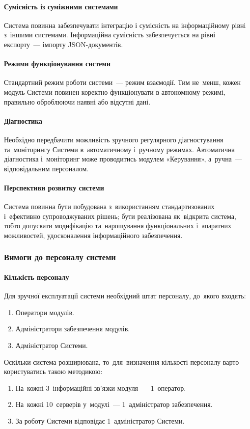 \documentclass[
	a4paper,
	oneside,
	BCOR = 10mm,
	DIV = 12,
	12pt,
	headings = normal,
]{scrartcl}
\newcommand{\allcaps}[1]{{\addfontfeatures{LetterSpace = 8, Kerning = Off}#1}}
\begin{document}
				\paragraph{Сумісність із суміжними системами}
					Система повинна забезпечувати інтеграцію і сумісність на інформаційному рівні з~іншими системами. Інформаційна сумісність забезпечується на рівні експорту~— імпорту \allcaps{JSON}-документів.

				\paragraph{Режими функціонування системи}
					Стандартний режим роботи системи~— режим взаємодії. Тим не~менш, кожен модуль Системи повинен коректно функціонувати в автономному режимі, правильно оброблюючи наявні або відсутні дані.

				\paragraph{Діагностика}
					Необхідно передбачити можливість зручного регулярного діагностування та~моніторингу Системи в~автоматичному і~ручному режимах. Автоматична діагностика і~моніторинг може проводитись модулем «Керування», а~ручна~— відповідальним персоналом.

				\paragraph{Перспективи розвитку системи}
					Система повинна бути побудована з~використанням стандартизованих і~ефективно супроводжуваних рішень; бути реалізована як~відкрита система, тобто допускати модифікацію та~нарощування функціональних і~апаратних можливостей, удосконалення інформаційного забезпечення.

			\subsubsection{Вимоги до персоналу системи}
				\paragraph{Кількість персоналу}
					Для зручної експлуатації системи необхідний штат персоналу, до~якого входять:
					\begin{enumerate}[noitemsep]
						\item Оператори модулів.
						\item Адміністратори забезпечення модулів.
						\item Адміністратор Системи.
					\end{enumerate}
					Оскільки система розширювана, то~для~визначення кількості персоналу варто користуватись такою методикою:
					\begin{enumerate}[noitemsep]
						\item На~кожні 3~інформаційні зв'язки модуля~— 1~оператор.
						\item На~кожні 10~серверів у~модулі~— 1~адміністратор забезпечення.
						\item За роботу Системи відповідає 1~адміністратор Системи.
					\end{enumerate}
\end{document}
